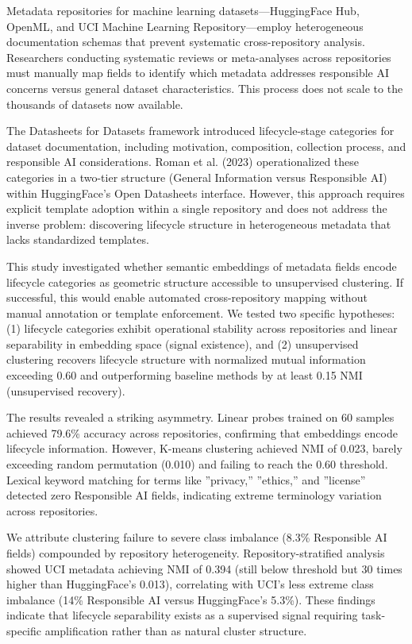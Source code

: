 
Metadata repositories for machine learning datasets---HuggingFace Hub, OpenML, and UCI Machine Learning Repository---employ heterogeneous documentation schemas that prevent systematic cross-repository analysis. Researchers conducting systematic reviews or meta-analyses across repositories must manually map fields to identify which metadata addresses responsible AI concerns versus general dataset characteristics. This process does not scale to the thousands of datasets now available.

The Datasheets for Datasets framework \citep{Gebru2018} introduced lifecycle-stage categories for dataset documentation, including motivation, composition, collection process, and responsible AI considerations. Roman et al. (2023) operationalized these categories in a two-tier structure (General Information versus Responsible AI) within HuggingFace's Open Datasheets interface. However, this approach requires explicit template adoption within a single repository and does not address the inverse problem: discovering lifecycle structure in heterogeneous metadata that lacks standardized templates.

This study investigated whether semantic embeddings of metadata fields encode lifecycle categories as geometric structure accessible to unsupervised clustering. If successful, this would enable automated cross-repository mapping without manual annotation or template enforcement. We tested two specific hypotheses: (1) lifecycle categories exhibit operational stability across repositories and linear separability in embedding space (signal existence), and (2) unsupervised clustering recovers lifecycle structure with normalized mutual information exceeding 0.60 and outperforming baseline methods by at least 0.15 NMI (unsupervised recovery).

The results revealed a striking asymmetry. Linear probes trained on 60 samples achieved 79.6\% accuracy across repositories, confirming that embeddings encode lifecycle information. However, K-means clustering achieved NMI of 0.023, barely exceeding random permutation (0.010) and failing to reach the 0.60 threshold. Lexical keyword matching for terms like ''privacy,'' ''ethics,'' and ''license'' detected zero Responsible AI fields, indicating extreme terminology variation across repositories.

We attribute clustering failure to severe class imbalance (8.3\% Responsible AI fields) compounded by repository heterogeneity. Repository-stratified analysis showed UCI metadata achieving NMI of 0.394 (still below threshold but 30 times higher than HuggingFace's 0.013), correlating with UCI's less extreme class imbalance (14\% Responsible AI versus HuggingFace's 5.3\%). These findings indicate that lifecycle separability exists as a supervised signal requiring task-specific amplification rather than as natural cluster structure.

